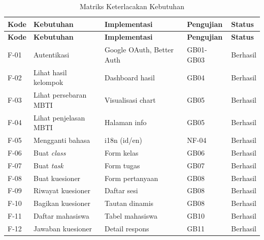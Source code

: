 \begin{longtable}{|p{}|p{}|p{}|p{}|p{}|}
	\caption{Matriks Keterlacakan Kebutuhan}
	\label{tab:traceability-matrix}                                                                            \\
	\hline
	\textbf{Kode} & \textbf{Kebutuhan}      & \textbf{Implementasi}     & \textbf{Pengujian} & \textbf{Status} \\
	\hline
	\endfirsthead
	\hline
	\textbf{Kode} & \textbf{Kebutuhan}      & \textbf{Implementasi}     & \textbf{Pengujian} & \textbf{Status} \\
	\hline
	\endhead
	F-01          & Autentikasi             & Google OAuth, Better Auth & GB01-GB03          & Berhasil        \\
	\hline
	F-02          & Lihat hasil kelompok    & Dashboard hasil           & GB04               & Berhasil        \\
	\hline
	F-03          & Lihat persebaran MBTI   & Visualisasi chart         & GB05               & Berhasil        \\
	\hline
	F-04          & Lihat penjelasan MBTI   & Halaman info              & GB05               & Berhasil        \\
	\hline
	F-05          & Mengganti bahasa        & i18n (id/en)              & NF-04              & Berhasil        \\
	\hline
	F-06          & Buat \textit{class}     & Form kelas                & GB06               & Berhasil        \\
	\hline
	F-07          & Buat \textit{task}      & Form tugas                & GB07               & Berhasil        \\
	\hline
	F-08          & Buat kuesioner          & Form pertanyaan           & GB08               & Berhasil        \\
	\hline
	F-09          & Riwayat kuesioner       & Daftar sesi               & GB08               & Berhasil        \\
	\hline
	F-10          & Bagikan kuesioner       & Tautan dinamis            & GB08               & Berhasil        \\
	\hline
	F-11          & Daftar mahasiswa        & Tabel mahasiswa           & GB10               & Berhasil        \\
	\hline
	F-12          & Jawaban kuesioner       & Detail respons            & GB11               & Berhasil        \\

\end{longtable}
